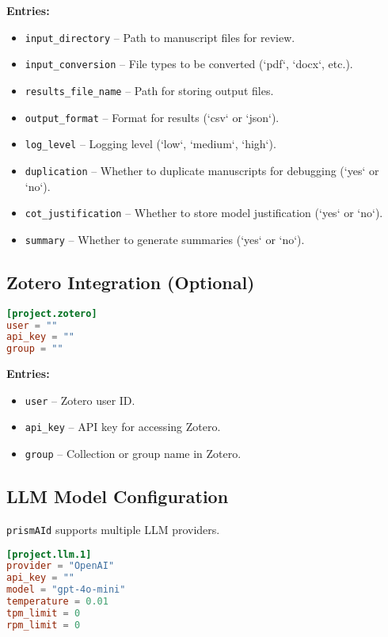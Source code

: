 \textbf{Entries:}
\begin{itemize}
    \item \texttt{input\_directory} – Path to manuscript files for review.
    \item \texttt{input\_conversion} – File types to be converted (`pdf`, `docx`, etc.).
    \item \texttt{results\_file\_name} – Path for storing output files.
    \item \texttt{output\_format} – Format for results (`csv` or `json`).
    \item \texttt{log\_level} – Logging level (`low`, `medium`, `high`).
    \item \texttt{duplication} – Whether to duplicate manuscripts for debugging (`yes` or `no`).
    \item \texttt{cot\_justification} – Whether to store model justification (`yes` or `no`).
    \item \texttt{summary} – Whether to generate summaries (`yes` or `no`).
\end{itemize}

\subsection{Zotero Integration (Optional)}

\begin{configbox}
\begin{lstlisting}[language=TOML]
[project.zotero]
user = ""
api_key = ""
group = ""
\end{lstlisting}
\end{configbox}

\textbf{Entries:}
\begin{itemize}
    \item \texttt{user} – Zotero user ID.
    \item \texttt{api\_key} – API key for accessing Zotero.
    \item \texttt{group} – Collection or group name in Zotero.
\end{itemize}

\subsection{LLM Model Configuration}

\texttt{prismAId} supports multiple LLM providers.

\begin{configbox}
\begin{lstlisting}[language=TOML]
[project.llm.1]
provider = "OpenAI"
api_key = ""
model = "gpt-4o-mini"
temperature = 0.01
tpm_limit = 0
rpm_limit = 0
\end{lstlisting}
\end{configbox}

